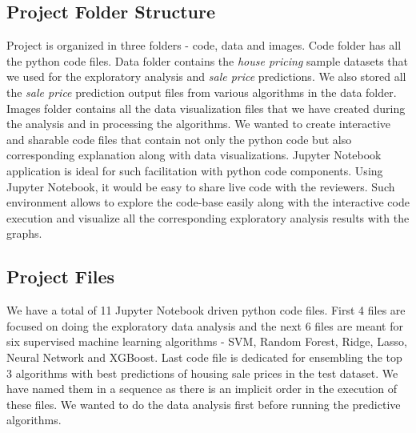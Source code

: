 \documentclass[sigconf]{acmart}
\begin{document}
    \subsection{Project Folder Structure}
    Project is organized in three folders - code, data and images. Code folder has all the python code files. Data folder contains the {\em house pricing} sample datasets that we used for the exploratory analysis and {\em sale price} predictions. We also stored all the {\em sale price} prediction output files from various algorithms in the data folder. Images folder contains all the data visualization files that we have created during the analysis and in processing the algorithms. We wanted to create interactive and sharable code files that contain not only the python code but also corresponding explanation along with data visualizations. Jupyter Notebook application is ideal for such facilitation with python code components. Using Jupyter Notebook, it would be easy to share live code with the reviewers. Such environment allows to explore the code-base easily along with the interactive code execution and visualize all the corresponding exploratory analysis results with the graphs.
    
    \subsection{Project Files}
    We have a total of 11 Jupyter Notebook driven python code files. First 4 files are focused on doing the exploratory data analysis and the next 6 files are meant for six supervised machine learning algorithms - SVM, Random Forest, Ridge, Lasso, Neural Network and XGBoost. Last code file is dedicated for ensembling the top 3 algorithms with best predictions of housing sale prices in the test dataset. We have named them in a sequence as there is an implicit order in the execution of these files. We wanted to do the data analysis first before running the predictive algorithms. 
        
\end{document}
